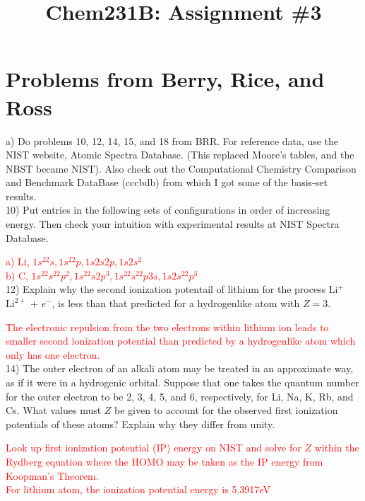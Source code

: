 \documentclass{article}
\title{Chem231B: Assignment \#3} %
\begin{document}
\maketitle

\section*{Problems from Berry, Rice, and Ross}

a) Do problems 10, 12, 14, 15, and 18 from BRR. For reference data,
use the NIST website, Atomic Spectra Database. (This replaced Moore’s
tables, and the NBST became NIST). Also check out the Computational Chemistry
Comparison and Benchmark DataBase (cccbdb) from which I got some of the
basis-set results.
\\

10) Put entries in the following sets of configurations in order of
increasing energy. Then check your intuition with experimental results
at NIST Spectra Database.

\textcolor{red}{a) Li, $1s^22s, 1s^22p, 1s2s2p, 1s2s^2$}
\\

\textcolor{red}{b) C, $1s^22s^22p^2, 1s^22s2p^3, 1s^22s^22p3s, 1s2s^22p^3$}
\\

12) Explain why the second ionization potentail of lithium for the
process Li$^+$ \rightarrow $\text{Li}^{2+}$ + $e^-$, is less than that predicted for
a hydrogenlike atom with $Z=3$.

\textcolor{red}{The electronic repulsion from the two electrons within lithium
  ion leads to smaller second ionization potential than predicted by a hydrogenlike
  atom which only has one electron.}
\\

14) The outer electron of an alkali atom may be treated in an approximate way,
as if it were in a hydrogenic orbital. Suppose that one takes the quantum number
for the outer electron to be 2, 3, 4, 5, and 6, respectively, for Li, Na,
K, Rb, and Cs. What values must $Z$ be given to account for the observed
first ionization potentials of these atoms? Explain why they differ from unity.

\textcolor{red}{Look up first ionization potential (IP) energy on NIST and solve
  for $Z$ within the Rydberg equation where the HOMO may be taken as the IP energy
  from Koopman's Theorem.}
\\

\textcolor{red}{For lithium atom, the ionization potential energy is 5.3917eV}
\\
\end{document}

